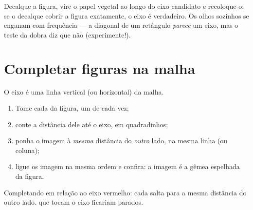 \begin{example}\label{ex:g4:symmetry:trace}
Decalque a figura, vire o papel vegetal ao longo do eixo candidato e
recoloque-o: se o decalque cobrir a figura exatamente, o eixo é
verdadeiro. Os olhos sozinhos se enganam com frequência --- a
diagonal de um retângulo \emph{parece} um eixo, mas o teste da dobra
diz que não (experimente!).
\end{example}

\section{Completar figuras na malha}

\begin{method}\label{met:g4:symmetry:grid}
O eixo é uma linha vertical (ou horizontal) da malha.
\begin{enumerate}
  \item Tome cada  da figura, um de cada vez;
  \item conte a distância dele até o eixo, em quadradinhos;
  \item ponha o  imagem à \emph{mesma} distância do
        \emph{outro} lado, na mesma linha (ou coluna);
  \item ligue os  imagem na mesma ordem e confira: a imagem é
        a gêmea espelhada da figura.
\end{enumerate}
\end{method}

\begin{omfigure}

{\small Completando em relação ao eixo vermelho: cada  salta
para a mesma distância do outro lado.  que tocam o eixo
ficariam parados.}
\end{omfigure}

